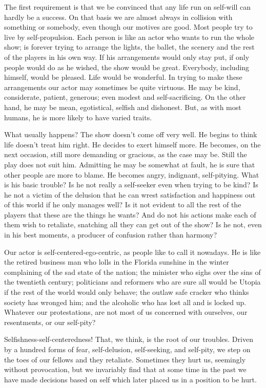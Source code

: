 \begin{biblechapter}
The first requirement is that we be convinced that any life run on self-will can hardly be a success.  On that basis we are almost always in collision with something or somebody, even though our motives are good.  Most people try to live by self-propulsion.  Each person is like an actor who wants to run the whole show; is forever trying to arrange the lights, the ballet, the scenery and the rest of the players in his own way.  If his arrangements would only stay put, if only people would do as he wished, the show would be great.  Everybody, including himself, would be pleased. Life would be wonderful.  In trying to make these arrangements our actor may sometimes be quite virtuous.  He may be kind, considerate, patient, generous; even modest and self-sacrificing.  On the other hand, he may be mean, egotistical, selfish and dishonest.  But, as with most humans, he is more likely to have varied traits.

What usually happens?  The show doesn't come off very well.  He begins to think life doesn't treat him right.  He decides to exert himself more.  He becomes, on the next occasion, still more demanding or gracious, as the case may be.  Still the play does not suit him.  Admitting he may be somewhat at fault, he is sure that other people are more to blame. He becomes angry, indignant, self-pitying.  What is his basic trouble?  Is he not really a self-seeker even when trying to be kind?  Is he not a victim of the delusion that he can wrest satisfaction and happiness out of this world if he only manages well?  Is it not evident to all the rest of the players that these are the things he wants?  And do not his actions make each of them wish to retaliate, snatching all they can get out of the show?  Is he not, even in his best moments, a producer of confusion rather than harmony?

Our actor is self-centered-ego-centric, as people like to call it nowadays.  He is like the retired business man who lolls in the Florida sunshine in the winter complaining of the sad state of the nation; the minister who sighs over the sins of the twentieth century; politicians and reformers who are sure all would be Utopia if the rest of the world would only behave; the outlaw safe cracker who thinks society has wronged him; and the alcoholic who has lost all and is locked up.  Whatever our protestations, are not most of us concerned with ourselves, our resentments, or our self-pity?

Selfishness-self-centeredness!  That, we think, is the root of our troubles.  Driven by a hundred forms of fear, self-delusion, self-seeking, and self-pity, we step on the toes of our fellows and they retaliate.  Sometimes they hurt us, seemingly without provocation, but we invariably find that at some time in the past we have made decisions based on self which later placed us in a position to be hurt.


\end{biblechapter}

